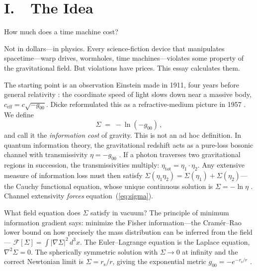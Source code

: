 \documentclass[12pt]{article}
\newcommand{\rs}{r_{\mathrm{s}}}
\begin{document}
\setcounter{page}{1}

\section*{I.\ \ The Idea}

How much does a time machine cost?

Not in dollars---in physics. Every science-fiction device that
manipulates spacetime---warp drives, wormholes, time machines---violates
some property of the gravitational field. But violations have prices.
This essay calculates them.




The starting point is an observation Einstein made in 1911, four years
before general relativity \cite{Einstein1911}: the coordinate speed of
light slows down near a massive body, $c_{\mathrm{eff}} = c\sqrt{-g_{00}}$.
Dicke reformulated this as a refractive-medium picture in 1957
\cite{Dicke1957}. We define
\begin{equation}
\Sigma \;=\; -\ln(-g_{00})\,,
\label{eq:sigma}
\end{equation}
and call it the \emph{information cost} of gravity. This is not an ad
hoc definition. In quantum information theory, the gravitational redshift
acts as a pure-loss bosonic channel with transmissivity
$\eta = -g_{00}$ \cite{AhmadiFuentes2014}. If a photon traverses two
gravitational regions in succession, the transmissivities multiply:
$\eta_{\mathrm{tot}} = \eta_1 \cdot \eta_2$. Any extensive measure of
information loss must then satisfy $\Sigma(\eta_1 \eta_2) = \Sigma(\eta_1)
+ \Sigma(\eta_2)$---the Cauchy functional equation, whose unique
continuous solution is $\Sigma = -\ln\eta$ \cite{Huang2026}. Channel
extensivity \emph{forces} equation~(\ref{eq:sigma}).

What field equation does $\Sigma$ satisfy in vacuum? The principle of
minimum information gradient says: minimize the Fisher information---the Cram\'er--Rao lower bound on how precisely the mass distribution can be inferred from the field---
$\mathcal{F}[\Sigma] = \int|\nabla\Sigma|^2\,d^3x$. The
Euler--Lagrange equation is the Laplace equation, $\nabla^2\Sigma = 0$.
The spherically symmetric solution with $\Sigma \to 0$ at infinity and
the correct Newtonian limit is $\Sigma = \rs/r$, giving the exponential
metric $g_{00} = -e^{-\rs/r}$ \cite{Papapetrou1954,Yilmaz1958}.
\end{document}
